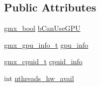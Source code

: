 \subsection*{\-Public \-Attributes}
\begin{DoxyCompactItemize}
\item 
\hyperlink{include_2types_2simple_8h_a8fddad319f226e856400d190198d5151}{gmx\-\_\-bool} \hyperlink{structgmx__hw__info__t_aa037b3ef1b023a7e22811a61d4326b83}{b\-Can\-Use\-G\-P\-U}
\item 
\hyperlink{structgmx__gpu__info__t}{gmx\-\_\-gpu\-\_\-info\-\_\-t} \hyperlink{structgmx__hw__info__t_afa4f79128ef06ef3c52ff037d1658bff}{gpu\-\_\-info}
\item 
\hyperlink{include_2gmx__cpuid_8h_aca8ed5c31d10235eeec45dfd0c17408b}{gmx\-\_\-cpuid\-\_\-t} \hyperlink{structgmx__hw__info__t_a3ff0b176a3bf6816a3e2d8ae529cc300}{cpuid\-\_\-info}
\item 
int \hyperlink{structgmx__hw__info__t_a29c14e5202581a74837ba4f19c6de866}{nthreads\-\_\-hw\-\_\-avail}
\end{DoxyCompactItemize}


